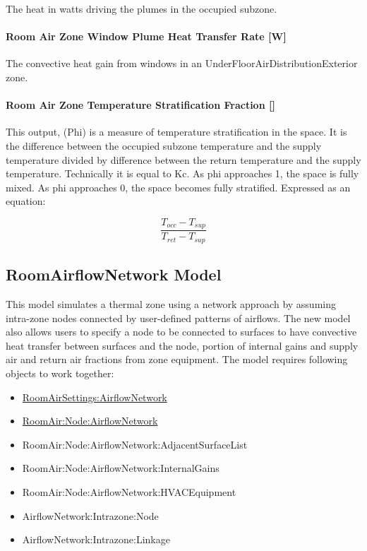 The heat in watts driving the plumes in the occupied subzone.

\paragraph{Room Air Zone Window Plume Heat Transfer Rate {[}W{]}}\label{room-air-zone-window-plume-heat-transfer-rate-w}

The convective heat gain from windows in an UnderFloorAirDistributionExterior zone.

\paragraph{Room Air Zone Temperature Stratification Fraction {[]}}\label{room-air-zone-temperature-stratification-fraction-2}

This output, (Phi) is a measure of temperature stratification in the space. It is the difference between the occupied subzone temperature and the supply temperature divided by difference between the return temperature and the supply temperature. Technically it is equal to Kc. As phi approaches 1, the space is fully mixed. As phi approaches 0, the space becomes fully stratified. Expressed as an equation:

\begin{equation}
  \frac{T_{occ} - T_{sup}}{T_{ret} - T_{sup}}
\end{equation}

\subsection{RoomAirflowNetwork Model}\label{roomairflownetwork-model}

This model simulates a thermal zone using a network approach by assuming intra-zone nodes connected by user-defined patterns of airflows. The new model also allows users to specify a node to be connected to surfaces to have convective heat transfer between surfaces and the node, portion of internal gains and supply air and return air fractions from zone equipment. The model requires following objects to work together:

\begin{itemize}
  \item
    \hyperref[roomairsettingsairflownetwork]{RoomAirSettings:AirflowNetwork}
  \item
    \hyperref[roomairnodeairflownetwork]{RoomAir:Node:AirflowNetwork}
  \item
    Room\-Air\-:Node:\-Air\-flow\-Net\-work:\-Ad\-jacent\-Sur\-face\-List
  \item
    RoomAir:Node:Air\-flow\-Net\-work:\-Internal\-Gains
  \item
    RoomAir:Node:Air\-flow\-Net\-work:\-HVAC\-Equipment
  \item
    AirflowNetwork:Intrazone:Node
  \item
    Airflow\-Net\-work:\-Intra\-zone:\-Link\-age
\end{itemize}

